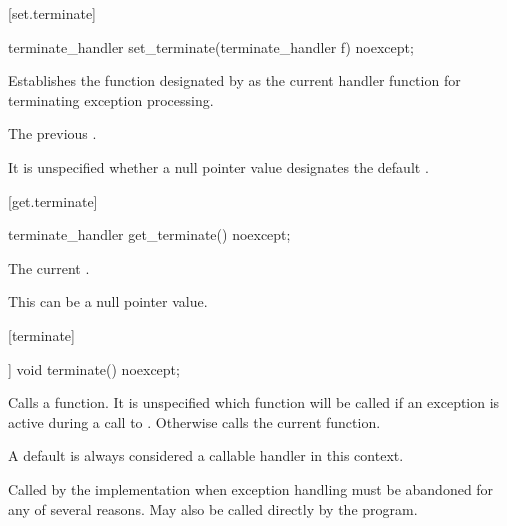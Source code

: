 [set.terminate]{}

%
\begin{itemdecl}
terminate_handler set_terminate(terminate_handler f) noexcept;
\end{itemdecl}

\begin{itemdescr}
\pnum
\effects
Establishes the function designated by  as the current
handler function for terminating exception processing.

\pnum
\returns
The previous .

\pnum
\remarks
It is unspecified whether a null pointer value designates the default
.
\end{itemdescr}

[get.terminate]{}

%
\begin{itemdecl}
terminate_handler get_terminate() noexcept;
\end{itemdecl}

\begin{itemdescr}
\pnum
\returns
The current .
\begin{note}
This can be a null pointer value.
\end{note}
\end{itemdescr}

[terminate]{}

%
\begin{itemdecl}
[[noreturn]] void terminate() noexcept;
\end{itemdecl}

\begin{itemdescr}
\pnum
\effects
Calls a  function. It is unspecified which
 function will be called if an exception is active
during a call to .
Otherwise calls the current  function.
\begin{note}
A
default  is always considered a callable handler in
this context.
\end{note}

\pnum
\remarks
Called by the implementation when exception
handling must be abandoned for any of several reasons.
May also be called directly by the program.
\end{itemdescr}

